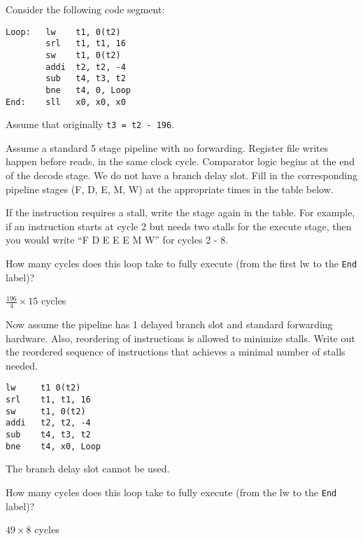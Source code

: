 \begin{blocksection}
Consider the following code segment:
\begin{verbatim}
Loop:	lw    t1, 0(t2)
		srl   t1, t1, 16
		sw    t1, 0(t2)
		addi  t2, t2, -4
		sub	  t4, t3, t2
		bne   t4, 0, Loop
End: 	sll   x0, x0, x0
\end{verbatim}
Assume that originally \texttt{t3 = t2 - 196}.

\begin{parts}
\item Assume a standard 5 stage pipeline with no forwarding. Register file writes happen before reads, in the same clock cycle. Comparator logic begins at the end of the decode stage. We do not have a branch delay slot. Fill in the corresponding pipeline stages (F, D, E, M, W) at the appropriate times in the table below. 

If the instruction requires a stall, write the stage again in the table. For example, if an instruction starts at cycle 2 but needs two stalls for the execute stage, then you would write “F D E E E M W” for cycles 2 - 8. 

\item How many cycles does this loop take to fully execute (from the first lw to the \texttt{End} label)?

\begin{solution}
$\frac{196}{4} \times 15$  cycles
\end{solution}

\item Now assume the pipeline has 1 delayed branch slot and standard forwarding hardware. Also, reordering of instructions is allowed to minimize stalls. Write out the reordered sequence of instructions that achieves a minimal number of stalls needed. 

\begin{solution}
\begin{verbatim}
lw 	   t1 0(t2)
srl    t1, t1, 16
sw     t1, 0(t2)
addi   t2, t2, -4
sub    t4, t3, t2
bne    t4, x0, Loop
\end{verbatim}
The branch delay slot cannot be used. 
\end{solution}

\item How many cycles does this loop take to fully execute (from the lw to the \texttt{End} label)?

\begin{solution}
$49 \times 8$ cycles
\end{solution}

\end{parts}
\end{blocksection}